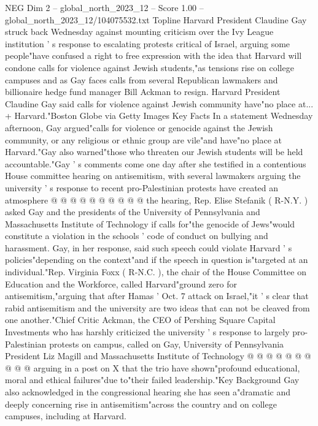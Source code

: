 \begin{textsample}{NEG Dim 2 – global\_north\_2023\_12 – Score 1.00 – global\_north\_2023\_12/104075532.txt}  \label{ex:f2_neg_338}
Topline Harvard President Claudine Gay struck back Wednesday against mounting criticism over the Ivy League institution ' s response to escalating protests critical of Israel, arguing some people"have confused a right to free expression with the idea that Harvard will condone calls for violence against Jewish students,"as tensions rise on college campuses and as Gay faces calls from several Republican lawmakers and billionaire hedge fund manager Bill Ackman to resign.
Harvard President Claudine Gay said calls for violence against Jewish community have"no place at... + Harvard."Boston Globe via Getty Images Key Facts In a statement Wednesday afternoon, Gay argued"calls for violence or genocide against the Jewish community, or any religious or ethnic group are vile"and have"no place at Harvard."Gay also warned"those who threaten our Jewish students will be held accountable."Gay ' s comments come one day after she testified in a contentious House committee hearing on antisemitism, with several lawmakers arguing the university ' s response to recent pro-Palestinian protests have created an atmosphere @ @ @ @ @ @ @ @ @ @ the hearing, Rep.
Elise Stefanik ( R-N.Y. ) asked Gay and the presidents of the University of Pennsylvania and Massachusetts Institute of Technology if calls for"the genocide of Jews"would constitute a violation in the schools ' code of conduct on bullying and harassment.
Gay, in her response, said such speech could violate Harvard ' s policies"depending on the context"and if the speech in question is"targeted at an individual."Rep.
Virginia Foxx ( R-N.C. ), the chair of the House Committee on Education and the Workforce, called Harvard"ground zero for antisemitism,"arguing that after Hamas ' Oct. 7 attack on Israel,"it ' s clear that rabid antisemitism and the university are two ideas that can not be cleaved from one another."Chief Critic Ackman, the CEO of Pershing Square Capital Investments who has harshly criticized the university ' s response to largely pro-Palestinian protests on campus, called on Gay, University of Pennsylvania President Liz Magill and Massachusetts Institute of Technology @ @ @ @ @ @ @ @ @ @ arguing in a post on X that the trio have shown"profound educational, moral and ethical failures"due to"their failed leadership."Key Background Gay also acknowledged in the congressional hearing she has seen a"dramatic and deeply concerning rise in antisemitism"across the country and on college campuses, including at Harvard.

\end{textsample}
